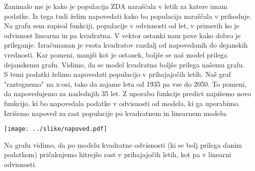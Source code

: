 \documentclass[11pt,a4paper]{article}
\begin{document}
Zanimalo me je kako je populacija ZDA naraščala v letih za katere imam podatke. Iz tega tudi želim napovedati kako bo populacija naraščala v prihodnje. \\
Na grafu sem zapisal funkciji, populacije v odvisnosti od let, v primerih ko je odvisnost linearna in pa kvadratna. V vektor ostanki nam pove kako dobro je prileganje. Izračunanan je vsota kvadratov razdalj od napovedanih do dejanskih vrednosti. Kar pomeni, manjši kot je ostanek, boljše se naš model prilega dejanskemu grafu. Vidimo, da se model kvadratna boljše prilega našemu grafu. \\
S temi podatki želimo napovedati populacijo v prihajajočih letih. Naš graf "raztegnemo" na x-osi, tako da zajame leta od 1935 pa vse do 2050. To pomeni, da napovedujemo za naslednjih 35 let.
Z uporabo funkcije predict napišemo novo funkcijo, ki bo napovedala podatke v odvisnosti od modela, ki ga uporabimo.\\
Izrišemo napoved za rast populacije po kvadratnem in linearnem modelu.

\texttt{[image: ../slike/napoved.pdf]}

Na grafu vidimo, da po modelu kvadratne odvisnosti (ki se bolj prilega danim podatkom) pričakujemo hitrejšo rast v prihajajočih letih, kot pa v linearni odvisnosti.
\end{document}
